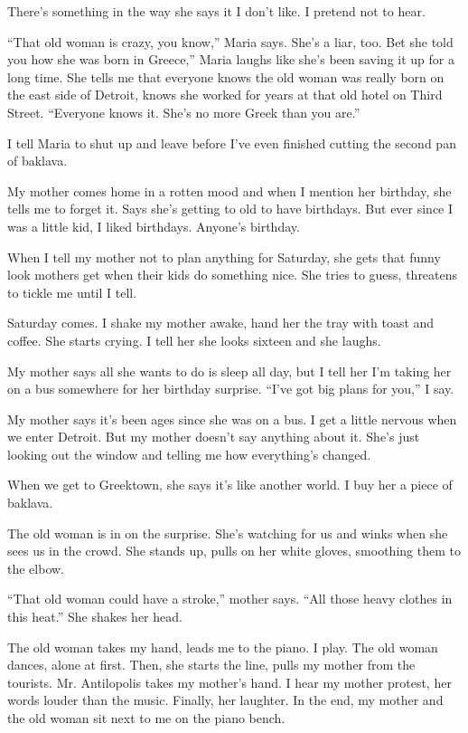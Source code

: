 \documentclass[twoside,10pt]{book}
\begin{document}
There's something in the way she says it I don't like. I pretend not to
hear.

``That old woman is crazy, you know,'' Maria says. She's a liar, too.
Bet she told you how she was born in Greece,'' Maria laughs like she's
been saving it up for a long time. She tells me that every­one knows the
old woman was really born on the east side of Detroit, knows she worked
for years at that old hotel on Third Street. ``Everyone knows it. She's
no more Greek than you are.''

I tell Maria to shut up and leave before I've even finished cutting the
second pan of baklava.

My mother comes home in a rotten mood and when I mention her birthday,
she tells me to forget it. Says she's getting to old to have birthdays.
But ever since I was a little kid, I liked birthdays. Anyone's birthday.

When I tell my mother not to plan anything for Saturday, she gets that
funny look mothers get when their kids do something nice. She tries to
guess, threatens to tickle me until I tell.

Saturday comes. I shake my mother awake, hand her the tray with toast
and coffee. She starts crying. I tell her she looks sixteen and she
laughs.

My mother says all she wants to do is sleep all day, but I tell her I'm
taking her on a bus some­where for her birthday surprise. ``I've got big
plans for you,'' I say.

My mother says it's been ages since she was on a bus. I get a little
nervous when we enter Detroit. But my mother doesn't say anything about
it. She's just looking out the window and telling me how everything's
changed.

When we get to Greektown, she says it's like another world. I buy her a
piece of baklava.

The old woman is in on the surprise. She's watching for us and winks
when she sees us in the crowd. She stands up, pulls on her white gloves,
smoothing them to the elbow.

``That old woman could have a stroke,'' mother says. ``All those heavy
clothes in this heat.'' She shakes her head.

The old woman takes my hand, leads me to the piano. I play. The old
woman dances, alone at first. Then, she starts the line, pulls my mother
from the tourists. Mr. Antilopolis takes my mother's hand. I hear my
mother protest, her words louder than the music. Finally, her laughter.
In the end, my mother and the old woman sit next to me on the piano
bench.
\end{document}
